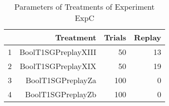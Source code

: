 \begin{table}[ht]
\centering
\begin{tabular}{rrrr}
  \hline
 & Treatment & Trials & Replay \\ 
  \hline
1 & BoolT1SGPreplayXIII &  50 & 13 \\ 
  2 & BoolT1SGPreplayXIX &  50 & 19 \\ 
  3 & BoolT1SGPreplayZa & 100 &  0 \\ 
  4 & BoolT1SGPreplayZb & 100 &  0 \\ 
   \hline
\end{tabular}
\caption{Parameters of Treatments of Experiment ExpC} 
\end{table}

